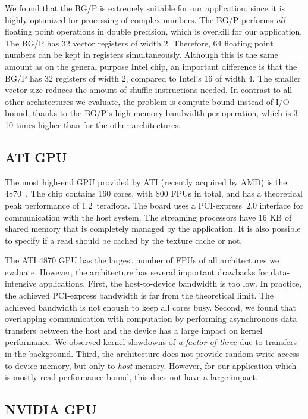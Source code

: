 \documentclass{article}
\begin{document}
We found that the BG/P is extremely suitable for our application,
since it is highly optimized for processing of complex numbers.
The BG/P performs \emph{all} floating point operations in double
precision, which is overkill for our application.
The BG/P has 32 vector registers of width 2.  Therefore, 64 floating
point numbers can be kept in registers
simultaneously. Although this is the same amount as on the general purpose
Intel chip, an important difference is that the BG/P has 32
registers of width 2, compared to Intel's 16 of width 4.  The smaller
vector size reduces the amount of shuffle instructions needed.
In contrast to all other architectures we evaluate, the problem is compute
bound instead of I/O bound, thanks to the BG/P's high memory bandwidth per
operation, which is 3--10 times higher than for the other architectures.


\subsection{ATI GPU}

The most high-end GPU provided by ATI (recently acquired by AMD) is
the 4870~\cite{amd-manual}.  The chip contains 160 cores, with 800 FPUs in total, 
and has a theoretical peak performance of
1.2~teraflops. The board uses a PCI-express~2.0 interface
for communication with the host system.
The streaming processors have 16 KB of shared
memory that is completely managed by the application. It is also
possible to specify if a read should be
cached by the texture cache or not.

The ATI 4870 GPU has the largest number of FPUs of all architectures
we evaluate.  However, the architecture has several important
drawbacks for data-intensive applications.  First, the
host-to-device bandwidth is too low. In practice, the achieved
PCI-express bandwidth is far from the theoretical limit. The achieved
bandwidth is not enough to keep all cores busy.  Second, we found that
overlapping communication with computation by performing asynchronous
data transfers between the host and the device has a large impact on
kernel performance. We observed kernel slowdowns of \emph{a factor of
three} due to transfers in the background.  Third, the architecture
does not provide random write access to device memory, but only to
\emph{host} memory. However, for our application which is mostly
read-performance bound, this does not have a large impact.


\subsection{NVIDIA GPU}
\end{document}
